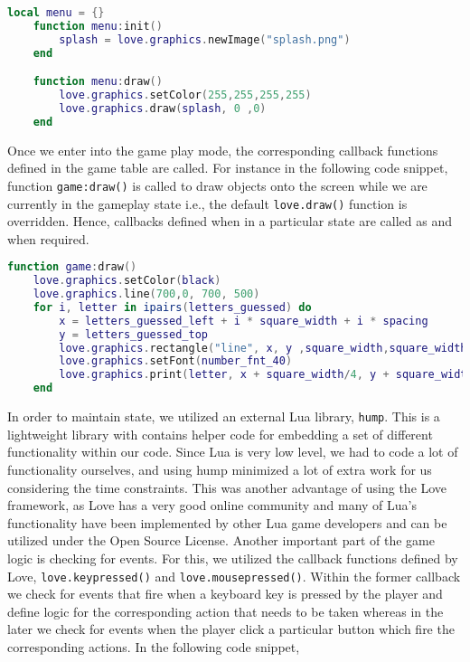 \begin{minipage}[t]{1\linewidth}
\begin{lstlisting}[language=Lua, %
  title={Splash Screen}, label=splash]
	local menu = {}
	function menu:init()
   		splash = love.graphics.newImage("splash.png")
	end

	function menu:draw()
    	love.graphics.setColor(255,255,255,255)
    	love.graphics.draw(splash, 0 ,0)
	end

\end{lstlisting}
\end{minipage}

Once we enter into the game play mode, the corresponding callback functions defined in the game table are called. For instance in the following code snippet, function \texttt{game:draw()} is called to draw objects onto the screen while we are currently in the gameplay state i.e., the default \texttt{love.draw()} function is overridden. Hence, callbacks defined when in a particular state are called as and when required.


\begin{minipage}[t]{1\linewidth}
\begin{lstlisting}[language=Lua, %
  title={Game State}, label=game]
	function game:draw()
    love.graphics.setColor(black)
    love.graphics.line(700,0, 700, 500)
    for i, letter in ipairs(letters_guessed) do
        x = letters_guessed_left + i * square_width + i * spacing
        y = letters_guessed_top
        love.graphics.rectangle("line", x, y ,square_width,square_width)
        love.graphics.setFont(number_fnt_40)
        love.graphics.print(letter, x + square_width/4, y + square_width/5)
    end

\end{lstlisting}
\end{minipage}

In order to maintain state, we utilized an external Lua library, \texttt{hump}. This is a lightweight library with contains helper code for embedding a set of different functionality within our code. Since Lua is very low level, we had to code a lot of functionality ourselves, and using hump minimized a lot of extra work for us considering the time constraints. This was another advantage of using the Love framework, as Love has a very good online community and many of Lua's functionality have been implemented by other Lua game developers and can be utilized under the Open Source License.
Another important part of the game logic is checking for events. For this, we utilized the callback functions defined by Love, \texttt{love.keypressed()} and \texttt{love.mousepressed()}. Within the former callback we check for events that fire when a keyboard key is pressed by the player and define logic for the corresponding action that needs to be taken whereas in the later we check for events when the player click a particular button which fire the corresponding actions. In the following code snippet,
	
